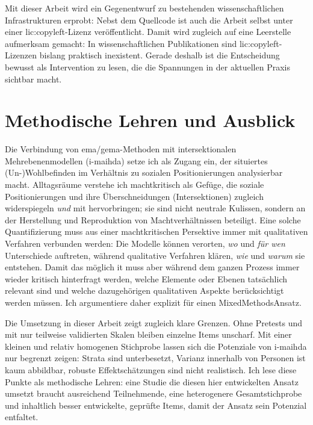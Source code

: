 Mit dieser Arbeit wird ein Gegenentwurf zu bestehenden wissenschaftlichen Infrastrukturen erprobt: Nebst dem Quellcode ist auch die Arbeit selbst unter einer \gls{lic:copyleft}-Lizenz veröffentlicht. Damit wird zugleich auf eine Leerstelle aufmerksam gemacht: In wissenschaftlichen Publikationen sind \gls{lic:copyleft}-Lizenzen bislang praktisch inexistent. Gerade deshalb ist die Entscheidung bewusst als Intervention zu lesen, die die Spannungen in der aktuellen Praxis sichtbar macht.

\section{Methodische Lehren und Ausblick}

Die Verbindung von \gls{ema}/\gls{gema}-Methoden mit intersektionalen Mehrebenenmodellen (\gls{i-maihda}) setze ich als Zugang ein, der situiertes (Un-)Wohlbefinden im Verhältnis zu sozialen Positionierungen analysierbar macht. Alltagsräume verstehe ich machtkritisch als Gefüge, die soziale Positionierungen und ihre Überschneidungen (Intersektionen) zugleich widerspiegeln \emph{und} mit hervorbringen; sie sind nicht neutrale Kulissen, sondern an der Herstellung und Reproduktion von Machtverhältnissen beteiligt. 
Eine solche Quantifizierung muss aus einer machtkritischen Persektive immer mit qualitativen Verfahren verbunden werden: Die Modelle können verorten, \emph{wo} und \emph{für wen} Unterschiede auftreten, während qualitative Verfahren klären, \emph{wie} und \emph{warum} sie entstehen. Damit das möglich it muss aber während dem ganzen Prozess immer wieder kritisch hinterfragt werden, welche Elemente oder Ebenen tatsächlich relevant sind und welche dazugehörigen qualitativen Aspekte berücksichtigt werden müssen. Ich argumentiere daher explizit für einen Mixed\-Methods\-Ansatz.

Die Umsetzung in dieser Arbeit zeigt zugleich klare Grenzen. Ohne Pretests und mit nur teilweise validierten Skalen bleiben einzelne Items unscharf. Mit einer kleinen und relativ homogenen Stichprobe lassen sich die Potenziale von \gls{i-maihda} nur begrenzt zeigen: Strata sind unterbesetzt, Varianz innerhalb von Personen ist kaum abbildbar, robuste Effektschätzungen sind nicht realistisch. Ich lese diese Punkte als methodische Lehren: eine Studie die diesen hier entwickelten Ansatz umsetzt braucht ausreichend Teilnehmende, eine heterogenere Gesamtstichprobe und inhaltlich besser entwickelte, geprüfte Items, damit der Ansatz sein Potenzial entfaltet.

